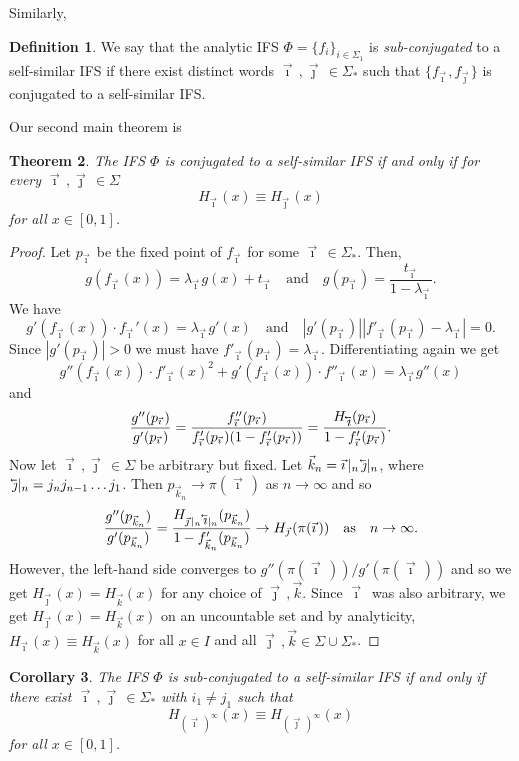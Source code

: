 \documentclass[12pt,]{article}
\newtheorem{theorem}{Theorem}[section]
\newtheorem{corollary}[theorem]{Corollary}
\theoremstyle{definition}
\newtheorem{definition}[theorem]{Definition}
\theoremstyle{remark}
\newcommand{\0}{\mathbf{0}}
\newcommand{\cev}[1]{\reflectbox{\ensuremath{\vec{\reflectbox{\ensuremath{#1}}}}}}
\newcommand{\bi}{\vec{\imath}\,}
\newcommand{\bj}{\vec{\jmath}\,}
\newcommand{\bk}{{\vec{k}}}
\newcommand{\bbi}{\,\cev{\imath}}
\newcommand{\bbj}{\,\cev{\jmath}}
\begin{document}
Similarly,
\begin{definition}
  We say that the analytic IFS $\Phi = \{f_i\}_{i\in\Sigma_1}$ is \emph{sub-conjugated} to a
  self-similar IFS if there exist distinct words $\bi,\bj\in\Sigma_*$ such that
  $\{f_{\bi},f_{\bj}\}$ is conjugated to a self-similar IFS.
\end{definition}
Our second main theorem is
\begin{theorem}
  The IFS $\Phi$ is conjugated to a self-similar IFS if and only if for every $\bi,\bj\in\Sigma$ 
  \[
    H_{\bi}(x) \equiv H_{\bj}(x)
  \]
  for all $x\in[0,1]$.
\end{theorem}
\begin{proof}
  Let $p_{\bi}$ be the fixed point of $f_{\bi}$ for some $\bi\in\Sigma_*$. Then,
  \[
    g(f_{\bi}(x)) = \lambda_{\bi} g(x) + t_{\bi}
    \quad\text{and}\quad
    g(p_{\bi}) = \frac{t_{\bi}}{1-\lambda_{\bi}}.
  \]
  We have
  \[
    g'(f_{\bi}(x))\cdot f_{\bi}'(x) = \lambda_{\bi} g'(x)
    \quad\text{and}\quad
    |g'(p_{\bi})||f'_{\bi}(p_{\bi})-\lambda_{\bi}| = 0.
  \]
  Since $|g'(p_{\bi})|>0$ we must have $f'_{\bi}(p_{\bi}) = \lambda_{\bi}$.
  Differentiating again we get
  \[
    g''(f_{\bi}(x))\cdot f'_{\bi}(x)^2 +g'(f_{\bi}(x))\cdot f''_{\bi}(x) = \lambda_{\bi} g''(x)
  \]
  and
  \[
    \frac{g''(p_{\bi})}{g'(p_{\bi})} =
    \frac{f_{\bi}''(p_{\bi})}{f_{\bi}'(p_{\bi})(1-f'_{\bi}(p_{\bi}))}
    =\frac{H_{\bbi}(p_{\bi})}{1-f'_{\bi}(p_{\bi})}.
  \]
  Now let $\bi,\bj\in\Sigma$ be arbitrary but fixed. Let $\bk_n = \bi|_n \bbj|_n$, where $\bbj|_n =
  j_nj_{n-1}\dots j_1$.
  Then $p_{\bk_n}\to \pi(\bi)$ as $n\to\infty$ and so
  \[
    \frac{g''(p_{\bk_n})}{g'(p_{\bk_n})}
    =\frac{H_{\bj|_n \bbi|_n}(p_{\bk_n})}{1-f'_{\bk_n}(p_{\bk_n})}
    \to
    H_{\bj}(\pi(\bi))\quad \text{as}\quad n\to\infty.
  \]
  However, the left-hand side converges to $g''(\pi(\bi))/g'(\pi(\bi))$ and so we get $H_{\bj}(x) =
  H_{\bk}(x)$ for any choice of $\bj,\bk$. Since $\bi$ was also arbitrary, we get $H_{\bj}(x) =
  H_{\bk}(x)$ on an uncountable set and by analyticity, $H_{\bi}(x)\equiv H_{\bk}(x)$ for all $x\in I$
  and all $\bj,\bk\in \Sigma\cup \Sigma_*$.
\end{proof}

\begin{corollary}
The IFS $\Phi$ is sub-conjugated to a self-similar IFS if and only if there exist $\bi,\bj\in\Sigma_*$ with $i_1\neq j_1$ such that 
\[
    H_{(\bi)^\infty}(x) \equiv H_{(\bj)^\infty}(x)
  \]
  for all $x\in[0,1]$.
\end{corollary}
\end{document}
